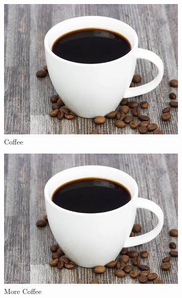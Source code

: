 \documentclass{article}
\begin{document}
	\begin{figure}[h!]
		\centering
		\begin{subfigure}[b]{0.2\linewidth}
			\includegraphics[width=\linewidth]{coffee.jpg}
			\caption{Coffee}
		\end{subfigure}
		\begin{subfigure}[b]{0.2\linewidth}
			\includegraphics[width=\linewidth]{coffee.jpg}
			\caption{More Coffee}
		\end{subfigure}
		\begin{subfigure}[b]{0.2\linewidth}

\end{subfigure}
\end{figure}
\end{document}
